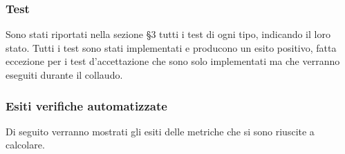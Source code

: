 \subsubsection{Test}
Sono stati riportati nella sezione §3 tutti i test di ogni tipo, indicando il loro stato. Tutti i test sono stati implementati e producono un esito positivo, fatta eccezione per i test d'accettazione che sono solo implementati ma che verranno eseguiti durante il collaudo.
\subsubsection{Esiti verifiche automatizzate}
Di seguito verranno mostrati gli esiti delle metriche che si sono riuscite a calcolare.